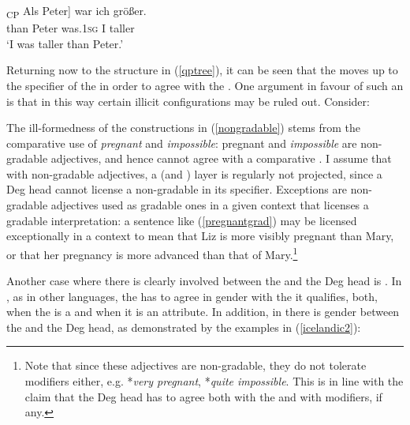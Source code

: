 \ea \label{alspeter2}
\gll {[}\textsubscript{CP} Als	Peter] war ich größer.\\
{} than Peter was.\textsc{1sg} I	taller\\
\glt `I was taller than Peter.'
\z

Returning now to the structure in (\ref{qptree}), it can be seen that the  moves up to the specifier of the  in order to agree with the . One argument in favour of such an  is that in this way certain illicit configurations may be ruled out. Consider:

\ea \label{nongradable}
 \label{pregnantgrad}
\z
\z

The ill-formedness of the constructions in (\ref{nongradable}) stems from the comparative use of \textit{pregnant} and \textit{impossible}: pregnant and \textit{impossible} are non-gradable adjectives, and hence cannot agree with a comparative . I assume that with non-gradable adjectives, a  (and ) layer is regularly not projected, since a Deg head cannot license a non-gradable  in its specifier. Exceptions are non-gradable adjectives used as gradable ones in a given context that licenses a gradable interpretation: a sentence like (\ref{pregnantgrad}) may be licensed exceptionally in a context to mean that Liz is more visibly pregnant than Mary, or that her pregnancy is more advanced than that of Mary.\footnote{Note that since these adjectives are non-gradable, they do not tolerate  modifiers either, e.g. *\textit{very pregnant}, *\textit{quite impossible}. This is in line with the claim that the Deg head has to agree both with the  and with  modifiers, if any.}

Another case where there is clearly  involved between the  and the Deg head is . In , as in other  languages, the  has to agree in gender with the  it qualifies, both, when the  is a  and when it is an attribute. In addition, in  there is gender  between the  and the Deg head, as demonstrated by the examples in (\ref{icelandic2}):

\ea \label{icelandic2}
\z
\z

